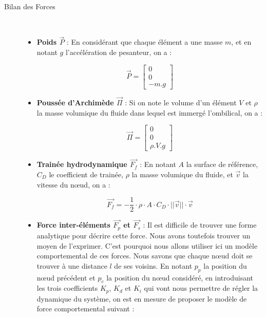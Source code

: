 				\begin{description}
					\item [Bilan des Forces] \
					\begin{itemize}
						\item[\textbullet] \textbf{Poids $\overrightarrow{P}$} : En considérant que chaque élément a une masse $m$, et en notant $g$ l'accélération de pesanteur, on a : 
						
						\begin{equation}
							\overrightarrow{P} = \begin{bmatrix}0\\ 0\\ -m.g\end{bmatrix}
							\label{eq:poids}
						\end{equation}
				
						\item[\textbullet] \textbf{Poussée d'Archimède $\overrightarrow{\Pi}$} : Si on note le volume d'un élément $V$ et $\rho$ la masse volumique du fluide dans lequel est immergé l'ombilical, on a : 
						
						\begin{equation}
							\overrightarrow{\Pi} = \begin{bmatrix}0\\ 0\\ \rho.V.g\end{bmatrix}
							\label{eq:archimede}
						\end{equation}
				
						\item[\textbullet] \textbf{Trainée hydrodynamique $\overrightarrow{F_f}$} : En notant $A$ la surface de référence, $C_D$ le coefficient de trainée, $\rho$ la masse volumique du fluide, et $\overrightarrow{v}$ la vitesse du n\oe ud, on a : 
					
						\begin{equation}
							\overrightarrow{F_f} = - \frac{1}{2} \cdot \rho \cdot A \cdot C_D \cdot ||\overrightarrow{v}|| \cdot \overrightarrow{v}
							\label{eq:drag}
						\end{equation}
						
						\item[\textbullet] \textbf{Force inter-éléments $\overrightarrow{F_p}$ et $\overrightarrow{F_s}$} : Il est difficile de trouver une forme analytique pour décrire cette force. Nous avons toutefois trouver un moyen de l'exprimer. C'est pourquoi nous allons utiliser ici un modèle comportemental de ces forces. Nous savons que chaque n\oe ud doit se trouver à une distance $l$ de ses voisins. En notant $p_{p}$ la position du n\oe ud précédent et $p_{c}$ la position du n\oe ud considéré, en introduisant les trois coefficients $K_p$, $K_d$ et $K_i$ qui vont nous permettre de régler la dynamique du système, on est en mesure de proposer le modèle de force comportemental suivant :
						

\end{itemize}
\end{description}

